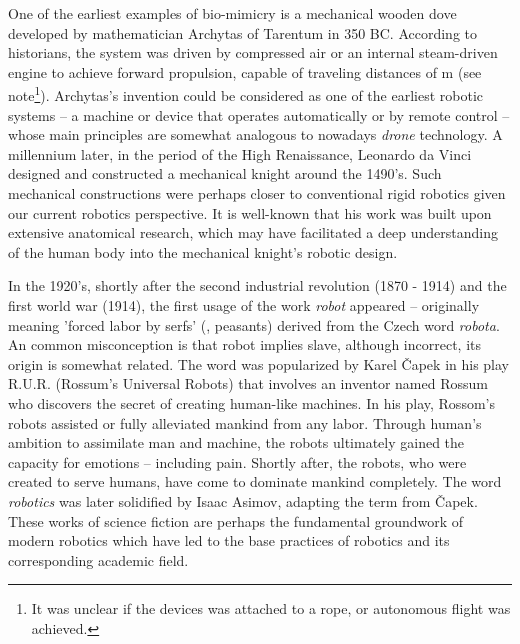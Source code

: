 \cleardoublepage
One of the earliest examples of bio-mimicry is a mechanical wooden dove developed by mathematician Archytas of Tarentum in 350 BC. According to historians, the system was driven by compressed air or an internal steam-driven engine to achieve forward propulsion, capable of traveling distances of  \si{\meter} (see note\footnote{It was unclear if the devices was attached to a rope, or autonomous flight was achieved.}). Archytas's invention could be considered as one of the earliest robotic systems -- a machine or device that operates automatically or by remote control -- whose main principles are somewhat analogous to nowadays \emph{drone} technology.  A millennium later, in the period of the High Renaissance, Leonardo da Vinci designed and constructed a mechanical knight around the 1490's. Such mechanical constructions were perhaps closer to conventional rigid robotics given our current robotics perspective. It is well-known that his work was built upon extensive anatomical research, which may have facilitated a deep understanding of the human body into the mechanical knight's robotic design.

\par In the 1920's, shortly after the second industrial revolution (1870 - 1914) and the first world war (1914), the first usage of the work \emph{robot} appeared -- originally meaning 'forced labor by serfs' (\ie, peasants) derived from the Czech word \emph{robota}. An common misconception is that robot implies slave, although incorrect, its origin is somewhat related. The word was popularized by Karel \v{C}apek in his play R.U.R. (Rossum’s Universal Robots) that involves an inventor named Rossum who discovers the secret of creating human-like machines. In his play, Rossom's robots assisted or fully alleviated mankind from any labor. Through human's ambition to assimilate man and machine, the robots ultimately gained the capacity for emotions -- including pain. Shortly after, the robots, who were created to serve humans, have come to dominate mankind completely. The word \emph{robotics} was later solidified by Isaac Asimov, adapting the term from \v{C}apek. These works of science fiction are perhaps the fundamental groundwork of modern robotics which have led to the base practices of robotics and its corresponding academic field.

